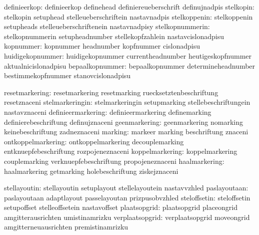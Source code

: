                  definieerkop:  definieerkop                 definehead
                                definiereueberschrift        definujnadpis
                    stelkopin:  stelkopin                    setuphead
                                stelleueberschriftein        nastavnadpis
                 stelkoppenin:  stelkoppenin                 setupheads
                                stelleueberschriftenein      nastavnadpisy
              stelkopnummerin:  stelkopnummerin              setupheadnumber
                                stellekopfzahlein            nastavcislonadpisu
                    kopnummer:  kopnummer                    headnumber
                                kopfnummer                   cislonadpisu
             huidigekopnummer:  huidigekopnummer             currentheadnumber
                                heutigeskopfnummer           aktualnicislonadpisu
              bepaalkopnummer:  bepaalkopnummer              determineheadnumber
                                bestimmekopfnummer           stanovcislonadpisu

               resetmarkering:  resetmarkering               resetmarking
                                ruecksetztenbeschriftung     resetznaceni
              stelmarkeringin:  stelmarkeringin              setupmarking
                                stellebeschriftungein        nastavznaceni
           definieermarkering:  definieermarkering           definemarking
                                definierebeschriftung        definujznaceni
                geenmarkering:  geenmarkering                nomarking
                                keinebeschriftung            zadneznaceni
                      marking:  markeer                      marking
                                beschriftung                 znaceni
           ontkoppelmarkering:  ontkoppelmarkering           decouplemarking
                                entknuepfebeschriftung       rozpojeneznaceni
              koppelmarkering:  koppelmarkering              couplemarking
                                verknuepfebeschriftung       propojeneznaceni
                haalmarkering:  haalmarkering                getmarking
                                holebeschriftung             ziskejznaceni

                 stellayoutin:  stellayoutin                 setuplayout
                                stellelayoutein              nastavvzhled
                 paslayoutaan:  paslayoutaan                 adaptlayout
                                passelayoutan                prizpusobvzhled
                 steloffsetin:  steloffsetin                 setupoffset
                                stelleoffsetein              nastavoffset
                 plaatsopgrid:  plaatsopgrid                 placeongrid
                                amgitterausrichten           umistinamrizku
              verplaatsopgrid:  verplaatsopgrid              moveongrid
                                amgitterneuausrichten        premistinamrizku

